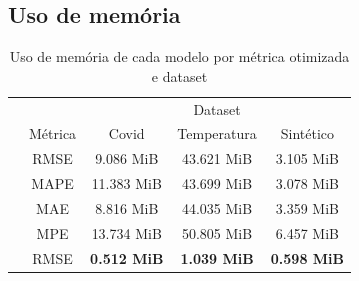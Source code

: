 \subsection{Uso de memória}

\begin{table}[!htp]
    \caption{Uso de memória de cada modelo por métrica otimizada e dataset}
    \setlength\extrarowheight{5pt}
    \centering
    \begin{tabular}{|c|c|ccc|}
        \hline
        \rowcolor[HTML]{C0C0C0}
        \cellcolor[HTML]{C0C0C0}                          & \cellcolor[HTML]{C0C0C0}                          & \multicolumn{3}{c|}{\cellcolor[HTML]{C0C0C0}Dataset}                                                                                                   \\ \cline{3-5}
        \rowcolor[HTML]{C0C0C0}
        \multirow{-2}{*}{\cellcolor[HTML]{C0C0C0}Modelo}  & \multirow{-2}{*}{\cellcolor[HTML]{C0C0C0}Métrica} & \multicolumn{1}{c|}{\cellcolor[HTML]{C0C0C0}Covid}              & \multicolumn{1}{c|}{\cellcolor[HTML]{C0C0C0}Temperatura}        & Sintético          \\ \hline
        \cellcolor[HTML]{C0C0C0}                          & RMSE                                              & \multicolumn{1}{c|}{9.086 MiB}                                  & \multicolumn{1}{c|}{43.621 MiB}                                 & 3.105 MiB          \\ \cline{2-5}
        \rowcolor[HTML]{EFEFEF}
        \cellcolor[HTML]{C0C0C0}                          & MAPE                                              & \multicolumn{1}{c|}{\cellcolor[HTML]{EFEFEF}11.383 MiB}         & \multicolumn{1}{c|}{\cellcolor[HTML]{EFEFEF}43.699 MiB}         & 3.078 MiB          \\ \cline{2-5}
        \cellcolor[HTML]{C0C0C0}                          & MAE                                               & \multicolumn{1}{c|}{8.816 MiB}                                  & \multicolumn{1}{c|}{44.035 MiB}                                 & 3.359 MiB          \\ \cline{2-5}
        \rowcolor[HTML]{EFEFEF}
        \multirow{-4}{*}{\cellcolor[HTML]{C0C0C0}ARIMA}   & MPE                                               & \multicolumn{1}{c|}{\cellcolor[HTML]{EFEFEF}13.734 MiB}         & \multicolumn{1}{c|}{\cellcolor[HTML]{EFEFEF}50.805 MiB}         & 6.457 MiB          \\ \hline
        \cellcolor[HTML]{C0C0C0}                          & RMSE                                              & \multicolumn{1}{c|}{\textbf{0.512 MiB}}                         & \multicolumn{1}{c|}{\textbf{1.039 MiB}}                         & \textbf{0.598 MiB} \\ \cline{2-5}

\end{tabular}
\end{table}

